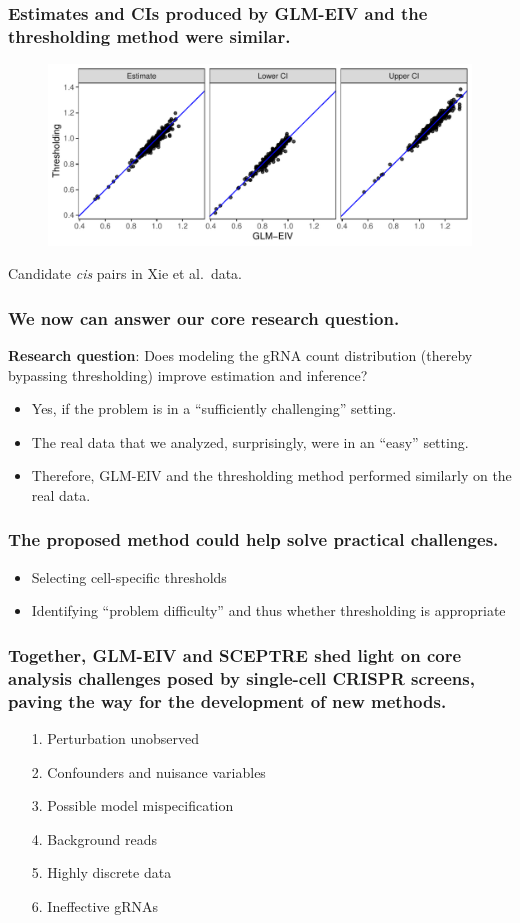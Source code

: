 \documentclass{beamer}
\begin{document}
\begin{frame}
\frametitle{Estimates and CIs produced by GLM-EIV and the thresholding method were similar.}
\begin{figure}
	\centering
	\includegraphics[width=1\linewidth]{../figures/fig5/comparison}
\end{figure}
\begin{center}
Candidate \textit{cis} pairs in Xie et al.\ data.
\end{center}
\end{frame}

\begin{frame}
\frametitle{We now can answer our core research question.}
\textbf{Research question}: Does modeling the gRNA count distribution (thereby bypassing thresholding) improve estimation and inference?
\begin{itemize}
\item Yes, if the problem is in a ``sufficiently challenging'' setting.
\item The real data that we analyzed, surprisingly, were in an ``easy'' setting.
\item Therefore, GLM-EIV and the thresholding method performed similarly on the real data.
\end{itemize}
\end{frame}


\begin{frame}
\frametitle{The proposed method could help solve practical challenges.}
\begin{itemize}
\item Selecting cell-specific thresholds
\item Identifying ``problem difficulty'' and thus whether thresholding is appropriate
\end{itemize}
\end{frame}

\begin{frame}
\frametitle{Together, GLM-EIV and SCEPTRE shed light on core analysis challenges posed by single-cell CRISPR screens, paving the way for the development of new methods.}
\begin{itemize}
	\item[1.] Perturbation unobserved
	\item[2.] Confounders and nuisance variables
	\item[3.] Possible model mispecification
	\item[4.] Background reads
	\item[5.] Highly discrete data
	\item[6.] Ineffective gRNAs
\end{itemize}
\end{frame}
\end{document}
